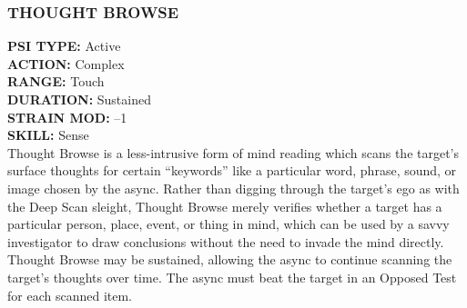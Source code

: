 \subsubsection{THOUGHT BROWSE}
\textbf{PSI TYPE:} Active \\ 
\textbf{ACTION:} Complex \\ 
\textbf{RANGE:} Touch \\ 
\textbf{DURATION:} Sustained \\
\textbf{STRAIN MOD:} –1 \\ 
\textbf{SKILL:} Sense\\
Thought Browse is a less-intrusive form of mind
reading which scans the target’s surface thoughts for
certain “keywords” like a particular word, phrase,
sound, or image chosen by the async. Rather than digging
through the target’s ego as with the Deep Scan
sleight, Thought Browse merely verifies whether a
target has a particular person, place, event, or thing
in mind, which can be used by a savvy investigator to
draw conclusions without the need to invade the mind
directly. Thought Browse may be sustained, allowing
the async to continue scanning the target’s thoughts
over time. The async must beat the target in an Opposed
Test for each scanned item.

